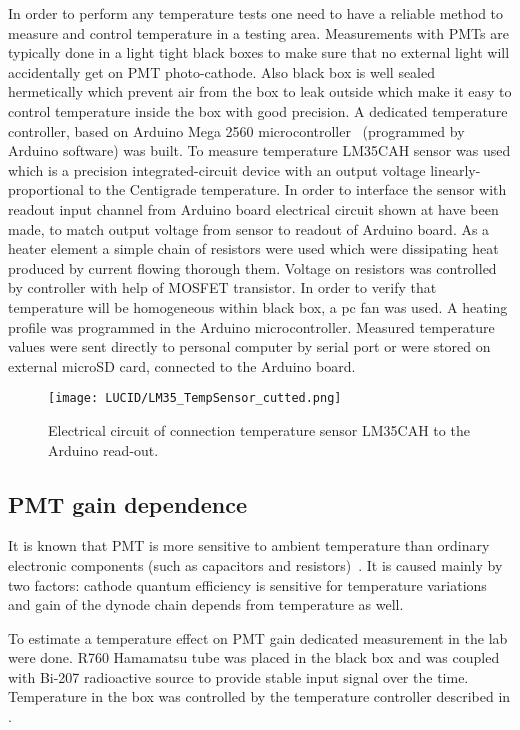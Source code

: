 In order to perform any temperature tests one need to have a reliable method to measure and control temperature in a testing area.
Measurements with PMTs are typically done in a light tight black boxes to make sure that no external light will accidentally get on PMT photo-cathode.
Also black box is well sealed hermetically which prevent air from the box to leak outside which make it easy to control temperature inside the box with good 
precision.
A dedicated temperature controller, based on Arduino Mega 2560 microcontroller~\cite{arduino} (programmed by Arduino software) was built.
To measure temperature LM35CAH sensor was used which is a precision integrated-circuit device with an output voltage linearly-proportional to the Centigrade 
temperature.
In order to interface the sensor with readout input channel from Arduino board electrical circuit shown at  have been made, 
to match output voltage from sensor to readout of Arduino board.
As a heater element a simple chain of resistors were used which were dissipating heat produced by current flowing thorough them. 
Voltage on resistors was controlled by controller with help of MOSFET transistor. In order to verify that temperature will be homogeneous within black box,
a pc fan was used. A heating profile was programmed in the Arduino microcontroller.
Measured temperature values were sent directly to personal computer by serial port or were stored on external microSD card, connected to the Arduino board.
 
 \begin{figure}
\centering
\texttt{[image: LUCID/LM35\_TempSensor\_cutted.png]}
\caption{Electrical circuit of connection temperature sensor LM35CAH to the Arduino read-out.}
\label{fig:tempReadOutCircuit}
\end{figure}

 
\subsection{PMT gain dependence}
\label{subsec:pmtGainTempDep}

It is known that PMT is more sensitive to ambient temperature than ordinary 
electronic components (such as capacitors and resistors)~\cite{hamamatsu}.
It is caused mainly by two factors: cathode quantum efficiency is sensitive for 
temperature variations and gain of the dynode chain depends from temperature as well.

To estimate a temperature effect on PMT gain dedicated measurement in the lab were done. 
R760 Hamamatsu tube was placed in the black box and was coupled with Bi-207 radioactive source
to provide stable input signal over the time. Temperature in the box was controlled by the temperature controller described in 
.

